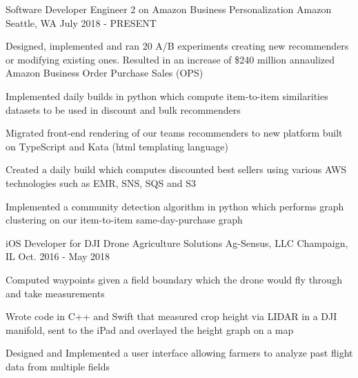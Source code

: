 

\begin{cventries}

  \cventry
    {Software Developer Engineer 2 on Amazon Business Personalization} %
    {Amazon} %
    {Seattle, WA} %
    {July 2018 - PRESENT} %
    {
      \begin{cvitems} %
        \item {Designed, implemented and ran 20 A/B experiments creating new recommenders or modifying existing ones. Resulted in an increase of \$240 million annaulized Amazon Business Order Purchase Sales (OPS) }
        \item {Implemented daily builds in python which compute item-to-item similarities datasets to be used in discount and bulk recommenders}
        \item {Migrated front-end rendering of our teams recommenders to new platform built on TypeScript and Kata (html templating language)}
        \item {Created a daily build which computes discounted best sellers using various AWS technologies such as EMR, SNS, SQS and S3}
        \item {Implemented a community detection algorithm in python which performs graph clustering on our item-to-item same-day-purchase graph}
      \end{cvitems}
    }

  \cventry
    {iOS Developer for DJI Drone Agriculture Solutions} %
    {Ag-Sensus, LLC} %
    {Champaign, IL} %
    {Oct. 2016 - May 2018} %
    {
      \begin{cvitems} %
        \item {Computed waypoints given a field boundary which the drone would fly through and take measurements}
        \item {Wrote code in C++ and Swift that measured crop height via LIDAR in a DJI manifold, sent to the iPad and overlayed the height graph on a map}
        \item {Designed and Implemented a user interface allowing farmers to analyze past flight data from multiple fields}
      \end{cvitems}
    }


\end{cventries}
